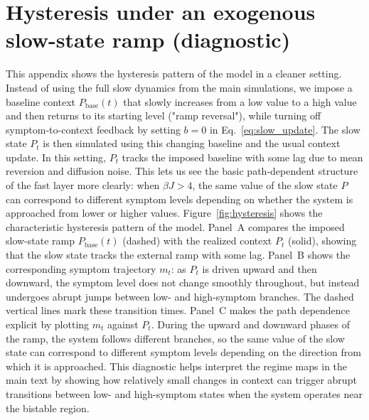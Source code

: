 \documentclass[man,12pt,floatsintext]{apa7}
\begin{document}
\section{Hysteresis under an exogenous slow-state ramp (diagnostic)}\label{sec:appendix_hysteresis}
This appendix shows the hysteresis pattern of the model in a cleaner setting. Instead of using the full slow dynamics from the main simulations, we impose a baseline context \(P_{\text{base}}(t)\) that slowly increases from a low value to a high value and then returns to its starting level ("ramp reversal"), while turning off symptom-to-context feedback by setting \(b=0\) in Eq.~\eqref{eq:slow_update}. The slow state \(P_t\) is then simulated using this changing baseline and the usual context update. In this setting, \(P_t\) tracks the imposed baseline with some lag due to mean reversion and diffusion noise. This lets us see the basic path-dependent structure of the fast layer more clearly: when \(\beta J>4\), the same value of the slow state \(P\) can correspond to different symptom levels depending on whether the system is approached from lower or higher values.
Figure~\ref{fig:hysteresis} shows the characteristic hysteresis pattern of the model. Panel~A compares the imposed slow-state ramp \(P_{\text{base}}(t)\) (dashed) with the realized context \(P_t\) (solid), showing that the slow state tracks the external ramp with some lag. Panel~B shows the corresponding symptom trajectory \(m_t\): as \(P_t\) is driven upward and then downward, the symptom level does not change smoothly throughout, but instead undergoes abrupt jumps between low- and high-symptom branches. The dashed vertical lines mark these transition times. Panel~C makes the path dependence explicit by plotting \(m_t\) against \(P_t\). During the upward and downward phases of the ramp, the system follows different branches, so the same value of the slow state can correspond to different symptom levels depending on the direction from which it is approached.
This diagnostic helps interpret the regime maps in the main text by showing how relatively small changes in context can trigger abrupt transitions between low- and high-symptom states when the system operates near the bistable region.
\end{document}
